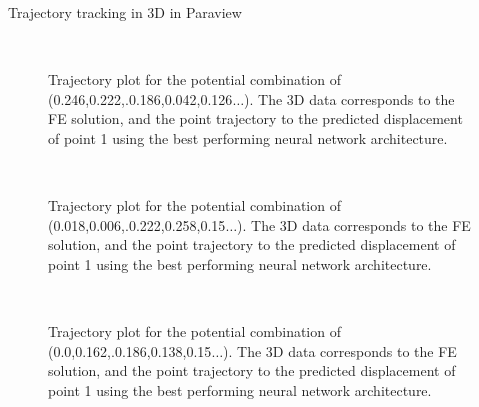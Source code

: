 Trajectory tracking in 3D in Paraview


\begin{figure}
  \centering
  \\
  \caption{Trajectory plot  for the potential combination of (0.246,0.222,.0.186,0.042,0.126$\dots$). The 3D data corresponds to the FE solution, and the point trajectory to the predicted displacement of point 1 using the best performing neural network architecture.}\label{fig:}
\end{figure}

\begin{figure}
  \centering
  \\
  \caption{Trajectory plot  for the potential combination of (0.018,0.006,.0.222,0.258,0.15$\dots$). The 3D data corresponds to the FE solution, and the point trajectory to the predicted displacement of point 1 using the best performing neural network architecture.}\label{fig:}
\end{figure}


\begin{figure}
  \centering
  \\
  \caption{Trajectory plot  for the potential combination of (0.0,0.162,.0.186,0.138,0.15$\dots$). The 3D data corresponds to the FE solution, and the point trajectory to the predicted displacement of point 1 using the best performing neural network architecture.}\label{fig:}
\end{figure}
